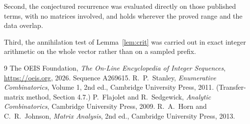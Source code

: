 \documentclass[11pt,a4paper]{article}
\theoremstyle{plain}
\theoremstyle{definition}
\begin{document}
Second, the conjectured recurrence was evaluated directly on those published terms, with no
matrices involved, and holds wherever the proved range and the data overlap.

Third, the annihilation test of Lemma~\ref{lem:crit} was carried out in exact integer
arithmetic on the whole vector rather than on a sampled prefix.

\begin{thebibliography}{9}
 The OEIS Foundation, \emph{The On-Line Encyclopedia of Integer
Sequences}, \url{https://oeis.org}, 2026. Sequence A269615.
 R.~P.~Stanley, \emph{Enumerative Combinatorics}, Volume 1, 2nd ed.,
Cambridge University Press, 2011. (Transfer-matrix method, Section 4.7.)
 P.~Flajolet and R.~Sedgewick, \emph{Analytic Combinatorics}, Cambridge
University Press, 2009.
 R.~A.~Horn and C.~R.~Johnson, \emph{Matrix Analysis}, 2nd ed., Cambridge
University Press, 2013.
\end{thebibliography}
\end{document}
